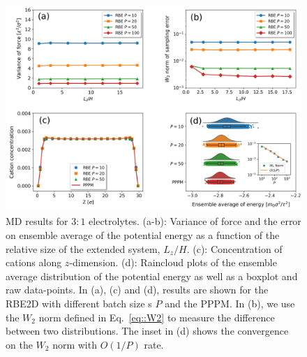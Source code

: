 \begin{figure}[!ht]
	\centering
\includegraphics[width=0.90\linewidth]{figs/3_1Elec.pdf}
	\caption{MD results for $3:1$ electrolytes. (a-b):  Variance of force and the error on ensemble average of the potential energy as a function of the relative size of the extended system, $L_z/H$. (c):  Concentration of cations along $z$-dimension. (d):  Raincloud plots of the ensemble average distribution of the potential energy as well as a boxplot and raw data-points. In (a), (c) and (d), results are shown for the RBE2D with different batch size {s} $P$ and the PPPM. In (b), we use the $W_2$ norm defined in Eq.~\eqref{eq::W2} to measure the difference between two distributions. The inset in (d) shows the convergence on the $W_2$ norm with $O(1/P)$ rate.}
	\label{fig:3_1}
\end{figure}

